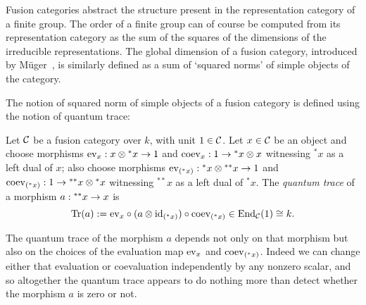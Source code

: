 \documentclass{amsart}
\begin{document}
Fusion categories abstract the structure present in the representation category of a finite group.  The order of a finite group can of course be computed from its representation category as the sum of the squares of the dimensions of the irreducible representations.  The global dimension of a fusion category, introduced by M\"uger~\cite{MR1966524}, is similarly defined as a sum of `squared norms' of simple objects of the category.  

The notion of squared norm of simple objects of a fusion category is defined using the notion of quantum trace:
\begin{definition}
Let $\mathcal C$ be a fusion category over $k$, with unit $1 \in \mathcal C$.  Let $x \in \mathcal C$ be an object and choose morphisms $\mathrm{ev}_x: x \otimes {}^* x \rightarrow 1$ and $\mathrm{coev}_x : 1 \rightarrow {}^* x \otimes x$ witnessing ${}^* x$ as a left dual of $x$; also choose morphisms $\mathrm{ev}_{({}^* x)} : {}^* x \otimes {}^{**} x \rightarrow 1$ and $\mathrm{coev}_{({}^* x)}: 1 \rightarrow {}^{**} x \otimes {}^* x$ witnessing ${}^{**} x$ as a left dual of ${}^* x$.  The \emph{quantum trace} of a morphism $a: {}^{**} x \rightarrow x$ is
\[
\mathrm{Tr}(a) := \mathrm{ev}_x \circ (a \otimes \mathrm{id}_{({}^* x)}) \circ \mathrm{coev}_{({}^* x)} \in \operatorname{End}_{\mathcal C}(1) \cong k.
\]
\end{definition}
\nid The quantum trace of the morphism $a$ depends not only on that morphism but also on the choices of the evaluation map $\mathrm{ev}_x$ and $\mathrm{coev}_{({}^* x)}$.  Indeed we can change either that evaluation or coevaluation independently by any nonzero scalar, and so altogether the quantum trace appears to do nothing more than detect whether the morphism $a$ is zero or not.  
\end{document}
